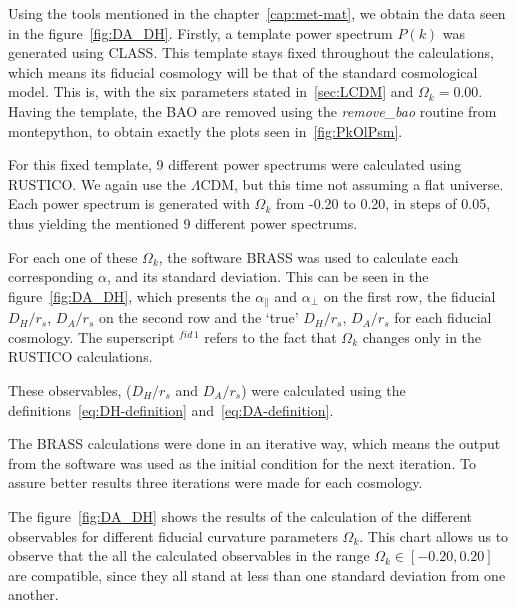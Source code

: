 Using the tools mentioned in the chapter~\ref{cap:met-mat}, we obtain the data seen in the figure~\ref{fig:DA_DH}. Firstly, a template power spectrum $P(k)$ was generated using CLASS. This template stays fixed throughout the calculations, which means its fiducial cosmology will be that of the standard cosmological model. This is, with the six parameters stated in~\ref{sec:LCDM} and $\Omega_k=0.00$. Having the template, the BAO are removed using the \textit{remove\_bao} routine from montepython, to obtain exactly the plots seen in~\ref{fig:PkOlPsm}.

For this fixed template, 9 different power spectrums were calculated using RUSTICO\@. We again use the $\Lambda$CDM, but this time not assuming a flat universe. Each power spectrum is generated with $\Omega_k$ from -0.20 to 0.20, in steps of 0.05, thus yielding the mentioned 9 different power spectrums.

For each one of these $\Omega_k$, the software BRASS was used to calculate each corresponding $\alpha$, and its standard deviation. This can be seen in the figure~\ref{fig:DA_DH}, which presents the $\alpha_\parallel$ and $\alpha_\perp$ on the first row, the fiducial $D_H / r_s$, $D_A/r_s $ on the second row and the `true' $D_H / r_s$, $D_A /r_s$ for each fiducial cosmology. The superscript $^{fid\, 1}$ refers to the fact that $\Omega_k$ changes only in the RUSTICO calculations. 

These observables, ($D_H /r_s$ and $D_A /r_s $) were calculated using the definitions~\eqref{eq:DH-definition} and~\eqref{eq:DA-definition}.

The BRASS calculations were done in an iterative way, which means the output from the software was used as the initial condition for the next iteration. To assure better results three iterations were made for each cosmology. 

The figure~\ref{fig:DA_DH} shows the results of the calculation of the different observables for different fiducial curvature parameters $\Omega_k$. This chart allows us to observe that the all the calculated observables in the range $\Omega_k  \in \left[ -0.20, 0.20   \right] $ are compatible, since they all stand at less than one standard deviation from one another.

